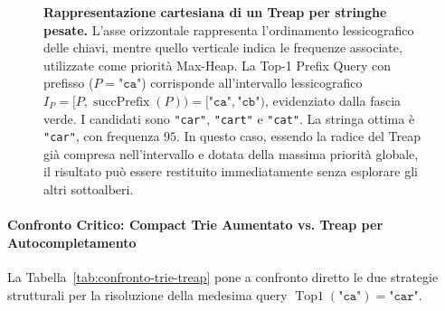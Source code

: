 \begin{figure}[H]
{%
}
\caption{\textbf{Rappresentazione cartesiana di un Treap per stringhe pesate.} L'asse orizzontale rappresenta l'ordinamento lessicografico delle chiavi, mentre quello verticale indica le frequenze associate, utilizzate come priorit\`a Max-Heap. La Top-1 Prefix Query con prefisso ($P=\texttt{"ca"}$) corrisponde all'intervallo lessicografico $I_P = [P, \operatorname{succPrefix}(P)) = [\texttt{"ca"}, \texttt{"cb"})$, evidenziato dalla fascia verde. I candidati sono \texttt{"car"}, \texttt{"cart"} e \texttt{"cat"}. La stringa ottima \`e \texttt{"car"}, con frequenza $95$. In questo caso, essendo la radice del Treap gi\`a compresa nell'intervallo e dotata della massima priorit\`a globale, il risultato pu\`o essere restituito immediatamente senza esplorare gli altri sottoalberi.}
\label{fig:treap-stringhe-autocompletion}
\end{figure}

\paragraph{Confronto Critico: Compact Trie Aumentato vs. Treap per Autocompletamento}
La Tabella~\ref{tab:confronto-trie-treap} pone a confronto diretto le due strategie strutturali per la risoluzione della medesima query $\operatorname{Top1}(\texttt{"ca"}) = \texttt{"car"}$.

